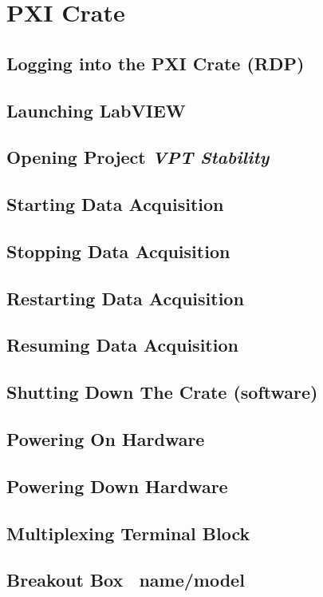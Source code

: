 
\section{PXI Crate}
\label{sec:op_pxi}

\subsection{Logging into the PXI Crate (RDP)}
\label{sec:op_pxi:rdp}

\subsection{Launching LabVIEW}
\label{sec:op_pxi:labview_launch}

\subsection{Opening Project \textit{VPT Stability}}
\label{sec:op_pxi:project_vptstability}

\subsection{Starting Data Acquisition}
\label{sec:op_pxi:daq_start}

\subsection{Stopping Data Acquisition}
\label{sec:op_pxi:daq_stop}

\subsection{Restarting Data Acquisition}
\label{sec:op_pxi:daq_restart}

\subsection{Resuming Data Acquisition}
\label{sec:op_pxi:daq_resume}

\subsection{Shutting Down The Crate (software)}
\label{sec:op_pxi:shutdown_software}

\subsection{Powering On Hardware}
\label{sec:op_pxi:poweron}

\subsection{Powering Down Hardware}
\label{sec:op_pxi:poweroff}

\subsection{Multiplexing Terminal Block}
\label{sec:op_pxi:tblock_disconnect}

\subsection{Breakout Box \FIXME\ name/model}
\label{sec:op_pxi:breakout}


